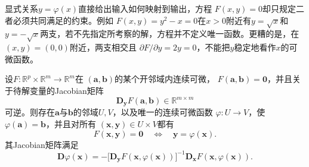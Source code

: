 显式关系$y=\varphi(x)$直接给出输入如何映射到输出，方程 $F(x,y)=0$却只规定二者必须共同满足的约束。例如 $F(x,y)=y^2-x=0$在$x>0$附近有$y=\sqrt{x}$和$y=-\sqrt{x}$两支，若不先指定所考察的解，方程并不定义唯一函数。更糟的是，在$(x,y)=(0,0)$附近，两支相交且 $\partial F/\partial y=2y=0$，不能把$y$稳定地看作$x$的可微函数。

\begin{theorem}[隐函数定理]
\label{thm:analysis-implicit-function}
设$F:\mathbb{R}^p\times\mathbb{R}^m\to\mathbb{R}^m$在 $(\bm{a},\bm{b})$的某个开邻域内连续可微， $F(\bm{a},\bm{b})=\bm{0}$，并且关于待解变量的Jacobian矩阵 \[   \bm{D}_{\bm{y}}F(\bm{a},\bm{b})   \in\mathbb{R}^{m\times m} \]
可逆。则存在$\bm{a}$与$\bm{b}$的邻域$U,V$，以及唯一的连续可微函数
$\varphi:U\to V$，使$\varphi(\bm{a})=\bm{b}$，并且对所有
$(\bm{x},\bm{y})\in U\times V$都有
\[
  F(\bm{x},\bm{y})=\bm{0}
  \quad\Longleftrightarrow\quad
  \bm{y}=\varphi(\bm{x}).
\]
其Jacobian矩阵满足
\begin{equation}
  \bm{D}\varphi(\bm{x})
  =
  -
  \bigl[\bm{D}_{\bm{y}}F(\bm{x},\varphi(\bm{x}))\bigr]^{-1}
  \bm{D}_{\bm{x}}F(\bm{x},\varphi(\bm{x})).
\label{eq:analysis-implicit-derivative}
\end{equation}
\end{theorem}

